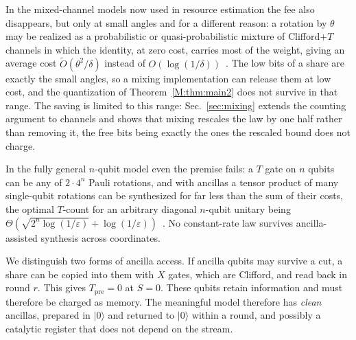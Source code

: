 \documentclass[aps,prx,twocolumn,superscriptaddress,nofootinbib,longbibliography]{revtex4-2}
\theoremstyle{plain}
\theoremstyle{definition}
\theoremstyle{remark}
\newcommand{\Tpre}{T_{\mathrm{pre}}}
\begin{document}
In the mixed-channel models now used in resource estimation the fee also disappears, but only at small angles and for a different reason: a rotation by $\theta$ may be realized as a probabilistic or quasi-probabilistic mixture of Clifford+$T$ channels in which the identity, at zero cost, carries most of the weight, giving an average cost $\tilde O(\theta^2/\delta)$ instead of $O(\log(1/\delta))$~\cite{Bothe}. The low bits of a share are exactly the small angles, so a mixing implementation can release them at low cost, and the quantization of Theorem~\ref{M:thm:main2} does not survive in that range. The saving is limited to this range: Sec.~\ref{sec:mixing} extends the counting argument to channels and shows that mixing rescales the law by one half rather than removing it, the free bits being exactly the ones the rescaled bound does not charge. 

In the fully general $n$-qubit model even the premise fails: a $T$ gate on $n$ qubits can be any of $2\cdot4^n$ Pauli rotations, and with ancillas a tensor product of many single-qubit rotations can be synthesized for far less than the sum of their costs, the optimal $T$-count for an arbitrary diagonal $n$-qubit unitary being $\Theta(\sqrt{2^n\log(1/\varepsilon)}+\log(1/\varepsilon))$~\cite{GKW}. No constant-rate law survives ancilla-assisted synthesis across coordinates.

We distinguish two forms of ancilla access. If ancilla qubits may survive a cut, a share can be copied into them with $X$ gates, which are Clifford, and read back in round $r$. This gives $\Tpre=0$ at $S=0$. These qubits retain information and must therefore be charged as memory. The meaningful model therefore has \emph{clean} ancillas, prepared in $|0\rangle$ and returned to $|0\rangle$ within a round, and possibly a catalytic register that does not depend on the stream.
\end{document}
